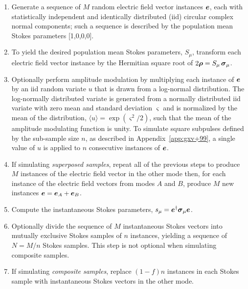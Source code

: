\documentclass[preprint]{aastex6}
\newcommand{\mbf}[1]{\mbox{\boldmath $#1$}}
\newcommand{\App}[1]{Appendix~\ref{app:#1}}
\newcommand{\irow}{\mu} \newcommand{\icol}{\nu}
\newcommand{\pauli}[1]{\ensuremath{\mbf{\sigma}_{#1}}}
\begin{document}
\begin{enumerate}
\item Generate a sequence of $M$ random electric field vector
  instances $\mbf{e}$, each with statistically independent and
  identically distributed (iid) circular complex normal components;
  such a sequence is described by the population mean Stokes
  parameters [1,0,0,0].
  
\item To yield the desired population mean Stokes parameters, $S_\irow$,
  transform each electric field vector instance by the Hermitian square
  root of $2\mbf\rho=S_\irow\,\pauli{\irow}$.

\item Optionally perform amplitude modulation by multiplying each
  instance of $\mbf{e}$ by an iid random variate $u$ that is drawn
  from a log-normal distribution.  The log-normally distributed
  variate is generated from a normally distributed iid variate with
  zero mean and standard deviation $\varsigma$ and is normalized by
  the mean of the distribution, $\langle u \rangle =
  \exp(\varsigma^2/2)$, such that the mean of the amplitude modulating
  function is unity.
  To simulate square subpulses defined by the sub-sample size $n$, as
  described in \App{gxv+99}, a single value of $u$ is applied to $n$
  consecutive instances of $\mbf{e}$.

\item If simulating \emph{superposed samples}, repeat all of the previous
  steps to produce $M$ instances of the electric field vector in the
  other mode then, for each instance of the electric field vectors
  from modes $A$ and $B$, produce $M$ new instances
  $\mbf{e}=\mbf{e}_A+\mbf{e}_B$.
  
\item Compute the instantaneous Stokes parameters,
  $s_\irow=\mbf{e}^\dagger\pauli{\irow}\mbf{e}$.

\item Optionally divide the sequence of $M$ instantaneous Stokes
  vectors into mutually exclusive Stokes samples of $n$ instances,
  yielding a sequence of $N=M/n$ Stokes samples.  This step is not
  optional when simulating composite samples.

\item If simulating \emph{composite samples}, replace $(1-f)n$ instances
  in each Stokes sample with instantaneous Stokes vectors in the
  other mode.


\end{enumerate}
\end{document}
